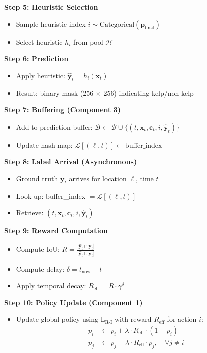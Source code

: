\documentclass[11pt]{article}
\begin{document}
\textbf{Step 5: Heuristic Selection}
\begin{itemize}
    \item Sample heuristic index $i \sim \text{Categorical}(\mathbf{p}_{\text{final}})$
    \item Select heuristic $h_i$ from pool $\mathcal{H}$
\end{itemize}

\textbf{Step 6: Prediction}
\begin{itemize}
    \item Apply heuristic: $\hat{\mathbf{y}}_t = h_i(\mathbf{x}_t)$
    \item Result: binary mask (256 $\times$ 256) indicating kelp/non-kelp
\end{itemize}

\textbf{Step 7: Buffering (Component 3)}
\begin{itemize}
    \item Add to prediction buffer: $\mathcal{B} \leftarrow \mathcal{B} \cup \{(t, \mathbf{x}_t, \mathbf{c}_t, i, \hat{\mathbf{y}}_t)\}$
    \item Update hash map: $\mathcal{L}[(\ell, t)] \leftarrow \text{buffer\_index}$
\end{itemize}

\textbf{Step 8: Label Arrival (Asynchronous)}
\begin{itemize}
    \item Ground truth $\mathbf{y}_t$ arrives for location $\ell$, time $t$
    \item Look up: buffer\_index $= \mathcal{L}[(\ell, t)]$
    \item Retrieve: $(t, \mathbf{x}_t, \mathbf{c}_t, i, \hat{\mathbf{y}}_t)$
\end{itemize}

\textbf{Step 9: Reward Computation}
\begin{itemize}
    \item Compute IoU: $R = \frac{|\hat{\mathbf{y}}_t \cap \mathbf{y}_t|}{|\hat{\mathbf{y}}_t \cup \mathbf{y}_t|}$
    \item Compute delay: $\delta = t_{\text{now}} - t$
    \item Apply temporal decay: $R_{\text{eff}} = R \cdot \gamma^{\delta}$
\end{itemize}

\textbf{Step 10: Policy Update (Component 1)}
\begin{itemize}
    \item Update global policy using L$_{\text{R-I}}$ with reward $R_{\text{eff}}$ for action $i$:
    \begin{align}
    p_i &\leftarrow p_i + \lambda \cdot R_{\text{eff}} \cdot (1 - p_i) \\
    p_j &\leftarrow p_j - \lambda \cdot R_{\text{eff}} \cdot p_j, \quad \forall j \neq i
    \end{align}
\end{itemize}
\end{document}
